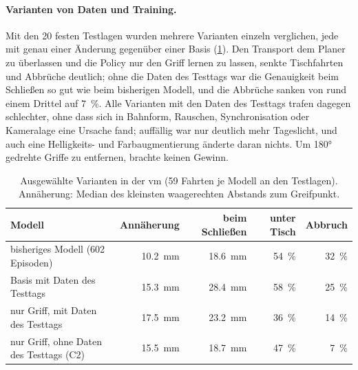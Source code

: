 \paragraph{Varianten von Daten und Training.} Mit den 20 festen Testlagen wurden mehrere Varianten
einzeln verglichen, jede mit genau einer Änderung gegenüber einer Basis
(\cref{tab:m4-varianten}). Den Transport dem Planer zu überlassen und die Policy nur den Griff
lernen zu lassen, senkte Tischfahrten und Abbrüche deutlich; ohne die Daten des Testtags war die
Genauigkeit beim Schließen so gut wie beim bisherigen Modell, und die Abbrüche sanken von rund
einem Drittel auf \SI{7}{\percent}. Alle Varianten mit den Daten des Testtags trafen dagegen
schlechter, ohne dass sich in Bahnform, Rauschen, Synchronisation oder Kameralage eine Ursache
fand; auffällig war nur deutlich mehr Tageslicht, und auch eine Helligkeits- und
Farbaugmentierung änderte daran nichts. Um \ang{180} gedrehte Griffe zu entfernen, brachte
keinen Gewinn.

\begin{table}[htbp]
  \centering
  \caption[Ausgewählte Varianten in der VM]{Ausgewählte Varianten in der \ac{vm} (59 Fahrten je
  Modell an den Testlagen). Annäherung: Median des kleinsten waagerechten Abstands zum Greifpunkt.}
  \label{tab:m4-varianten}
  \begin{tabularx}{\textwidth}{@{}X r r r r@{}}
    \toprule
    Modell & Annäherung & beim Schließen & unter Tisch & Abbruch \\
    \midrule
    bisheriges Modell (602 Episoden) & \SI{10.2}{\milli\metre} & \SI{18.6}{\milli\metre} & \SI{54}{\percent} & \SI{32}{\percent} \\
    Basis mit Daten des Testtags & \SI{15.3}{\milli\metre} & \SI{28.4}{\milli\metre} & \SI{58}{\percent} & \SI{25}{\percent} \\
    nur Griff, mit Daten des Testtags & \SI{17.5}{\milli\metre} & \SI{23.2}{\milli\metre} & \SI{36}{\percent} & \SI{14}{\percent} \\
    nur Griff, ohne Daten des Testtags (C2) & \SI{15.5}{\milli\metre} & \SI{18.7}{\milli\metre} & \SI{47}{\percent} & \SI{7}{\percent} \\
    \bottomrule
  \end{tabularx}
\end{table}

